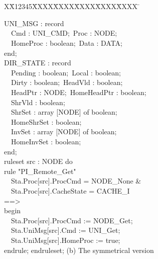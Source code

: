 \documentclass{llncs-new}
\newlength{\fminilength}
\newenvironment{fmini}[1][\linewidth]
  {\setlength{\fminilength}{#1\fboxsep-2\fboxrule}%
   \vspace{2ex}\noindent\begin{lrbox}{\fminibox}\begin{minipage}{\fminilength}%
   \mbox{ }\hfill\vspace{-2.5ex}}%
  {\end{minipage}\end{lrbox}\vspace{1ex}\hspace{0ex}%
   \framebox{\usebox{\fminibox}}}
\newenvironment{specification}
{\noindent\scriptsize
\tt\begin{fmini}\begin{tabbing}X\=X12345\=XXXX\=XXXX\=XXXX\=XXXX\=XXXX
\=\+\kill} {\end{tabbing}\normalfont\end{fmini}}
\def \twoSpaces {\ \ }
\def \twoSpaces {\ \ }
\begin{document}
{\begin{specification}
\begin{minipage}[t]{0.4\linewidth}
UNI\_MSG : record\\
\indent \twoSpaces  Cmd : UNI\_CMD;\     Proc : NODE;\\
\indent \twoSpaces     HomeProc : boolean;\       Data : DATA;\\
  end;\\
  DIR\_STATE : record\\
\indent \twoSpaces    Pending : boolean;\     Local : boolean;\\
\indent \twoSpaces     Dirty : boolean;\      HeadVld : boolean;\\
\indent \twoSpaces     HeadPtr : NODE;\      HomeHeadPtr : boolean;\\
\indent \twoSpaces     ShrVld : boolean;\\
\indent \twoSpaces     ShrSet : array [NODE] of boolean;\\
\indent \twoSpaces     HomeShrSet : boolean;\\
\indent \twoSpaces     InvSet : array [NODE] of boolean;\\
\indent \twoSpaces     HomeInvSet : boolean;\\
  end;\\
  ruleset src : NODE do\\
rule "PI\_Remote\_Get"\\
\indent \twoSpaces   Sta.Proc[src].ProcCmd = NODE\_None \&\\
\indent \twoSpaces   Sta.Proc[src].CacheState = CACHE\_I\\
==>\\
begin\\
\indent \twoSpaces   Sta.Proc[src].ProcCmd := NODE\_Get;\\
\indent \twoSpaces   Sta.UniMsg[src].Cmd := UNI\_Get;\\
\indent \twoSpaces   Sta.UniMsg[src].HomeProc := true;\\
endrule; endruleset;
\center (b) The symmetrical version\\
\end{minipage}
\end{specification}
}
\end{document}
